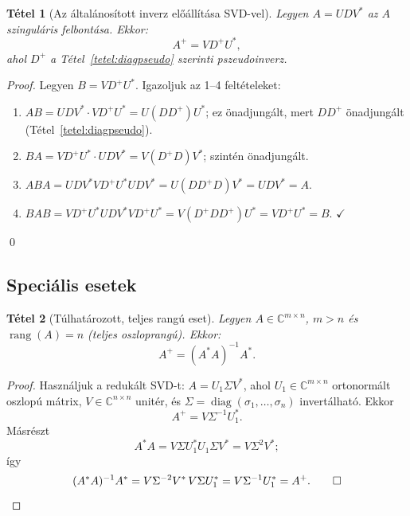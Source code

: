 \documentclass[a4paper,12pt]{article}
\theoremstyle{mydef}
\newtheorem{tetel}{Tétel}[section]
\newcommand{\C}{\mathbb{C}}
\DeclareMathOperator{\rang}{rang}
\DeclareMathOperator{\diag}{diag}
\begin{document}
\begin{mdframed}[backgroundcolor=thmbg,linewidth=0pt,innertopmargin=8pt,innerbottommargin=8pt]
\begin{tetel}[Az általánosított inverz előállítása SVD-vel]
\label{tetel:pseudosvd}
Legyen $A = UDV^*$ az $A$ szinguláris felbontása. Ekkor:
\[
  A^+ = V D^+ U^*,
\]
ahol $D^+$ a Tétel~\ref{tetel:diagpseudo} szerinti pszeudoinverz.
\end{tetel}
\end{mdframed}

\begin{proof}
Legyen $B = VD^+U^*$. Igazoljuk az 1--4 feltételeket:
\begin{enumerate}[noitemsep,topsep=2pt]
  \item $AB = UDV^*\cdot VD^+U^* = U(DD^+)U^*$; ez önadjungált, mert $DD^+$ önadjungált
        (Tétel~\ref{tetel:diagpseudo}).
  \item $BA = VD^+U^*\cdot UDV^* = V(D^+D)V^*$; szintén önadjungált.
  \item $ABA = UDV^*VD^+U^*UDV^* = U(DD^+D)V^* = UDV^* = A$.
  \item $BAB = VD^+U^*UDV^*VD^+U^* = V(D^+DD^+)U^* = VD^+U^* = B$. $\checkmark$
\end{enumerate}
\qed
\end{proof}

\subsection*{Speciális esetek}

\begin{mdframed}[backgroundcolor=thmbg,linewidth=0pt,innertopmargin=8pt,innerbottommargin=8pt]
\begin{tetel}[Túlhatározott, teljes rangú eset]
\label{tetel:tulhatarozottPS}
Legyen $A \in \C^{m\times n}$, $m > n$ és $\rang(A) = n$ (teljes oszloprangú). Ekkor:
\[
  A^+ = (A^*A)^{-1}A^*.
\]
\end{tetel}
\end{mdframed}

\begin{proof}
Használjuk a redukált SVD-t: $A=U_1\Sigma V^*$, ahol
$U_1\in\C^{m\times n}$ ortonormált oszlopú mátrix, $V\in\C^{n\times n}$ unitér,
és $\Sigma=\diag(\sigma_1,\ldots,\sigma_n)$ invertálható. Ekkor
\[
  A^+ = V\Sigma^{-1}U_1^*.
\]
Másrészt
\[
  A^*A = V\Sigma U_1^*U_1\Sigma V^* = V\Sigma^2V^*;
\]
így
\[
  (A^*A)^{-1}A^*
  = V\Sigma^{-2}V^*\,V\Sigma U_1^*
  = V\Sigma^{-1}U_1^* = A^+. \qed
\]
\end{proof}
\end{document}
